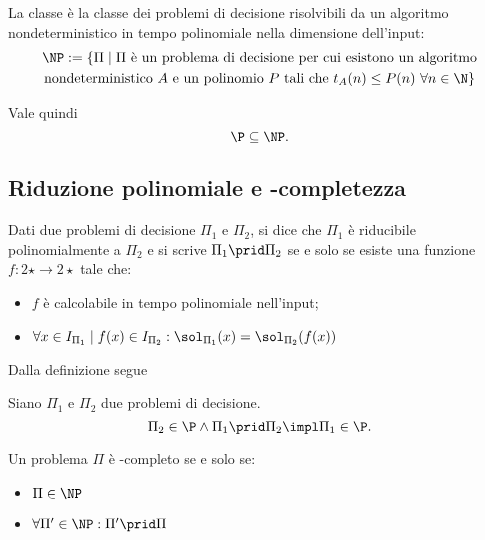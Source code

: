 \begin{defin}[NP]
	La classe \NP è la classe dei problemi di decisione risolvibili da un algoritmo nondeterministico in tempo polinomiale nella dimensione dell'input:
	\begin{gather*}
		\NP :=\{\Pi\mid \Pi\text{ è un problema di decisione per cui esistono un algoritmo}\\
		\text{nondeterministico $A$ e un polinomio $P$ tali che }t_A(n)\leq P(n)~\forall n\in\N\}
	\end{gather*}
\end{defin}

Vale quindi
\begin{equation*}
	\P\subseteq\NP\text.
\end{equation*}


\subsection{Riduzione polinomiale e \texorpdfstring{\NP}{NP}-completezza}
\begin{defin}
	Dati due problemi di decisione $\Pi_1$ e $\Pi_2$, si dice che $\Pi_1$ è riducibile polinomialmente a $\Pi_2$ e si scrive $\Pi_1\prid\Pi_2$ se e solo se esiste una funzione $f:2\star\to2\star$ tale che:
	\begin{itemize}
		\item $f$ è calcolabile in tempo polinomiale nell'input;
		\item $\forall x\in I_{\Pi_1}\mid f(x)\in I_{\Pi_2}: \sol_{\Pi_1}(x)=\sol_{\Pi_2}(f(x))$
	\end{itemize}
\end{defin}

Dalla definizione segue
\begin{theorem}\label{lem:poli_red}
	Siano $\Pi_1$ e $\Pi_2$ due problemi di decisione.
	\begin{equation*}
		\Pi_2\in\P\land\Pi_1\prid\Pi_2 \impl \Pi_1\in\P\text.
	\end{equation*}
\end{theorem}

\begin{defin}
	Un problema $\Pi$ è \NP-completo se e solo se:
	\begin{itemize}
		\item $\Pi\in\NP$
		\item $\forall\Pi'\in\NP: \Pi'\prid \Pi$
	\end{itemize}
\end{defin}


